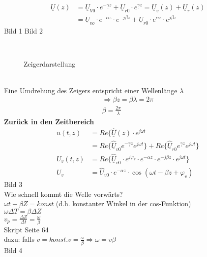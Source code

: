 \begin{align}
	\underline{U}(z) &= \underline{U}_{V0}\cdot e^{-\underline{\gamma}
	z}+\underline{U}_{r0}\cdot
	e^{\underline{\gamma}z}=\underline{U}_v(z)+\underline{U}_r(z)\nonumber\\
	&= \underline{U}_{vo}\cdot e^{-\alpha z}\cdot e^{-j\beta
	z}+\underline{U}_{r0}\cdot e^{\alpha z}\cdot e^{j\beta z}\nonumber
\end{align}
Bild 1 Bild 2\\
\begin{figure}[!h]
\centering
{}
\qquad
{}\\
\caption{Zeigerdarstellung}
\label{fig:leitungstheorie:impedanz}
\end{figure}\\
Eine Umdrehung des Zeigers entspricht einer Wellenlänge $\lambda$\\
\begin{align}
	\Rightarrow \beta z = \beta \lambda = 2 \pi\nonumber\\
	\boxed{\beta=\frac{2\pi}{\lambda}}\nonumber
\end{align}
\textbf{Zurück in den Zeitbereich}
\begin{align}
	u(t,z)&=Re\{\hat{\underline{U}}(z)\cdot e^{j\omega t}\nonumber\\
	&=Re\{\hat{\underline{U}}_{v0}e^{-\underline{\gamma}z}e^{j\omega
	t}\}+Re\{\hat{\underline{U}}_{r0}e^{\underline{\gamma}z}e^{j\omega
	t}\}\nonumber\\
	U_v(t,z)&=Re\{\underline{\hat{U}}_{v0}\cdot e^{j\varphi_v}\cdot e^{-\alpha
	z}\cdot e^{-j\beta z}\cdot e^{j\omega t}\}\nonumber\\
	U_v&=\hat{U}_{v0}\cdot e^{-\alpha z}\cdot \cos\left(\omega t-\beta
	z+\varphi_v\right)\nonumber
\end{align}
Bild 3\\
Wie schnell kommt die Welle vorwärts?\\
$\omega t-\beta Z=konst$ (d.h. konstanter Winkel in der cos-Funktion)\\
$\omega\Delta T=\beta\Delta Z$\\
$v_p=\frac{\Delta Z}{\Delta t}=\frac{\omega}{\beta}$\\
Skript Seite 64\\
dazu: falls $v=konst. v=\frac{\omega}{\beta}\Rightarrow \omega=v\beta$\\
Bild 4\\
